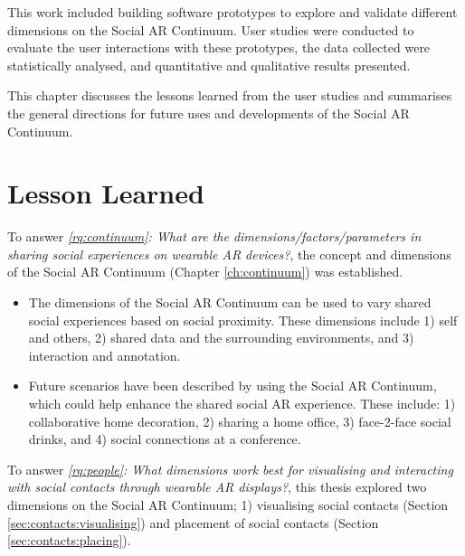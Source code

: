 This work included building software prototypes to explore and validate different dimensions on the Social AR Continuum. User studies were conducted to evaluate the user interactions with these prototypes, the data collected were statistically analysed, and quantitative and qualitative results presented.

This chapter discusses the lessons learned from the user studies and summarises the general directions for future uses and developments of the Social AR Continuum. 

\pagebreak

\section{Lesson Learned}
\noindent
To answer \textit{\ref{rq:continuum}: What are the dimensions/factors/parameters in sharing social experiences on wearable AR devices?}, the concept and dimensions of the Social AR Continuum (Chapter \ref{ch:continuum}) was established.

\begin{itemize}
    \item{The dimensions of the Social AR Continuum can be used to vary shared social experiences based on social proximity. These dimensions include 1) self and others, 2) shared data and the surrounding environments, and 3) interaction and annotation.}
    \item{Future scenarios have been described by using the Social AR Continuum, which could help enhance the shared social AR experience. These include: 1) collaborative home decoration, 2) sharing a home office, 3) face-2-face social drinks, and 4) social connections at a conference.}
\end{itemize}

\noindent
To answer \textit{\ref{rq:people}: What dimensions work best for visualising and interacting with social contacts through wearable AR displays?}, this thesis explored two dimensions on the Social AR Continuum; 1) visualising social contacts (Section \ref{sec:contacts:visualising}) and placement of social contacts (Section \ref{sec:contacts:placing}). 

